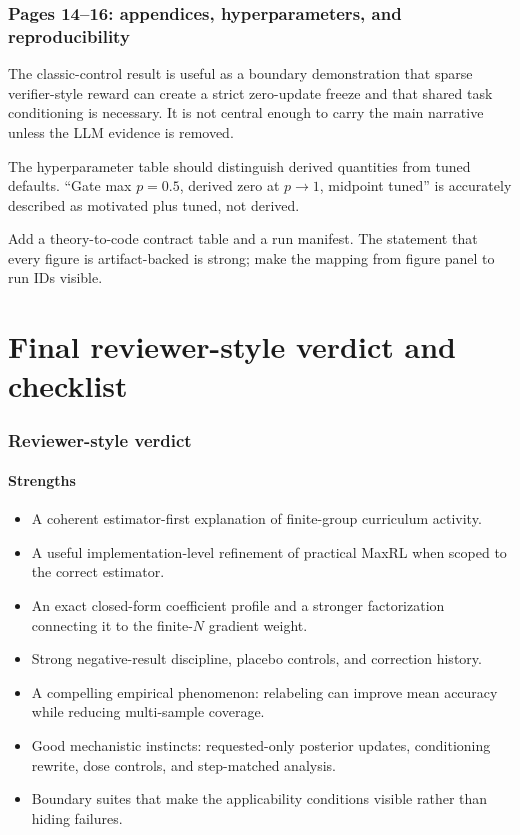 \documentclass[11pt]{article}
\theoremstyle{definition}
\theoremstyle{remark}
\begin{document}
\section{Pages 14--16: appendices, hyperparameters, and reproducibility}

The classic-control result is useful as a boundary demonstration that sparse verifier-style reward can create a strict zero-update freeze and that shared task conditioning is necessary. It is not central enough to carry the main narrative unless the LLM evidence is removed.

The hyperparameter table should distinguish derived quantities from tuned defaults. ``Gate max $p=0.5$, derived zero at $p\to1$, midpoint tuned'' is accurately described as motivated plus tuned, not derived.

Add a theory-to-code contract table and a run manifest. The statement that every figure is artifact-backed is strong; make the mapping from figure panel to run IDs visible.

\part{Final reviewer-style verdict and checklist}

\section{Reviewer-style verdict}

\subsection{Strengths}

\begin{itemize}[leftmargin=2em]
\item A coherent estimator-first explanation of finite-group curriculum activity.
\item A useful implementation-level refinement of practical MaxRL when scoped to the correct estimator.
\item An exact closed-form coefficient profile and a stronger factorization connecting it to the finite-$N$ gradient weight.
\item Strong negative-result discipline, placebo controls, and correction history.
\item A compelling empirical phenomenon: relabeling can improve mean accuracy while reducing multi-sample coverage.
\item Good mechanistic instincts: requested-only posterior updates, conditioning rewrite, dose controls, and step-matched analysis.
\item Boundary suites that make the applicability conditions visible rather than hiding failures.
\end{itemize}
\end{document}
